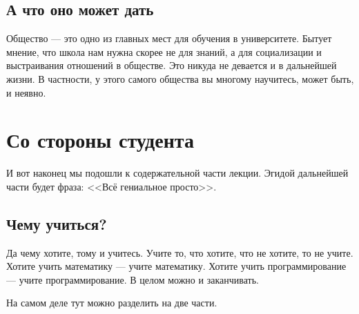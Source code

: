\documentclass[12pt, a4paper]{article}
\begin{document}
\subsection{А что оно может дать}

Общество --- это одно из главных мест для обучения в университете. Бытует мнение, что школа нам нужна скорее не для знаний, а для социализации и выстраивания отношений в обществе. Это никуда не девается и в дальнейшей жизни. В частности, у этого самого общества вы многому научитесь, может быть, и неявно.

\section{Со стороны студента}

И вот наконец мы подошли к содержательной части лекции. Эгидой дальнейшей части будет фраза: <<Всё гениальное просто>>.

\subsection{Чему учиться?}

Да чему хотите, тому и учитесь. Учите то, что хотите, что не хотите, то не учите. Хотите учить математику --- учите математику. Хотите учить программирование --- учите программирование. В целом можно и заканчивать. 

На самом деле тут можно разделить на две части.
\end{document}
